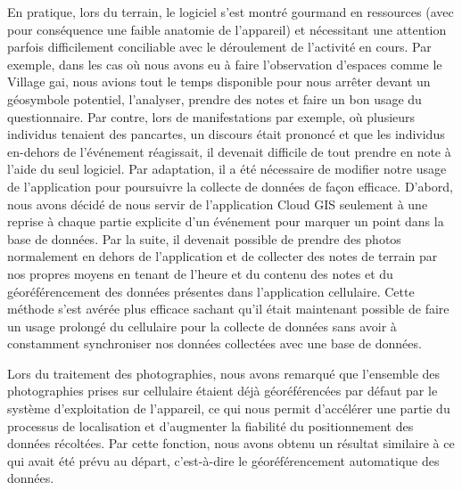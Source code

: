 En pratique, lors du terrain, le logiciel s'est montré gourmand en ressources (avec pour conséquence une faible anatomie de l'appareil) et nécessitant une attention parfois difficilement conciliable avec le déroulement de l'activité en cours. 
Par exemple, dans les cas où nous avons eu à faire l'observation d'espaces comme le Village gai, nous avions tout le temps disponible pour nous arrêter devant un géosymbole potentiel, l'analyser, prendre des notes et faire un bon usage du questionnaire. 
Par contre, lors de manifestations par exemple, où plusieurs individus tenaient des pancartes, un discours était prononcé et que les individus en-dehors de l'événement réagissait, il devenait difficile de tout prendre en note à l'aide du seul logiciel. 
Par adaptation, il a été nécessaire de modifier notre usage de l'application pour poursuivre la collecte de données de façon efficace. 
D'abord, nous avons décidé de nous servir de l'application Cloud GIS seulement à une reprise à chaque partie explicite d'un événement pour marquer un point dans la base de données. 
Par la suite, il devenait possible de prendre des photos normalement en dehors de l'application et de collecter des notes de terrain par nos propres moyens en tenant de l'heure et du contenu des notes et du géoréférencement des données présentes dans l'application cellulaire. 
Cette méthode s'est avérée plus efficace sachant qu'il était maintenant possible de faire un usage prolongé du cellulaire pour la collecte de données sans avoir à constamment synchroniser nos données collectées avec une base de données.

Lors du traitement des photographies, nous avons remarqué que l'ensemble des photographies prises sur cellulaire étaient déjà géoréférencées par défaut par le système d'exploitation de l'appareil, ce qui nous permit d'accélérer une partie du processus de localisation et d'augmenter la fiabilité du positionnement des données récoltées. 
Par cette fonction, nous avons obtenu un résultat similaire à ce qui avait été prévu au départ, c'est-à-dire le géoréférencement automatique des données. 

